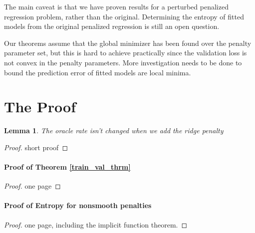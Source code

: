 \documentclass[12pt]{article}
\newtheorem{lemma}{Lemma}
\begin{document}
The main caveat is that we have proven results for a perturbed penalized regression problem, rather than the original. Determining the entropy of fitted models from the original penalized regression is still an open question.

Our theorems assume that the global minimizer has been found over the penalty parameter set, but this is hard to achieve practically since the validation loss is not convex in the penalty parameters. More investigation needs to be done to bound the prediction error of fitted models are local minima.

\section{The Proof} \label{sec:proofs}

\begin{lemma}
The oracle rate isn't changed when we add the ridge penalty
\end{lemma}
\begin{proof}
short proof
\end{proof}

\paragraph{Proof of Theorem \ref{train_val_thrm}}
\begin{proof}
one page
\end{proof}

\paragraph{Proof of Entropy for nonsmooth penalties}
\begin{proof}
one page, including the implicit function theorem.
\end{proof}
\end{document}
